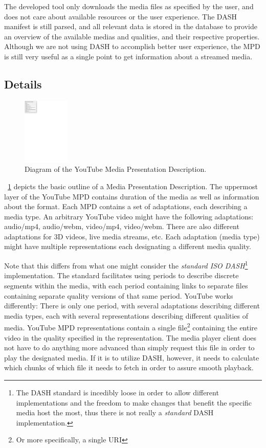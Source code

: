 The developed tool only downloads the media files as specified by the
user, and does not care about available resources or the user experience.
The DASH manifest is still parsed, and all relevant data is stored in the
database to provide an overview of the available medias and qualities,
and their respective properties. Although we are not using DASH to
accomplish better user experience, the MPD is still very useful as a
single point to get information about a streamed media.

\subsection{Details}

\begin{figure}
	\centering
	\includegraphics[width=0.2\textwidth]{figures/dash-mpd-diagram}
	\caption{Diagram of the YouTube Media Presentation Description.}
    \label{fig:dash-mpd-diagram}
\end{figure}

~\ref{fig:dash-mpd-diagram} depicts the basic outline of a Media Presentation
Description. The uppermost layer of the YouTube MPD contains duration of the
media as well as information about the format. Each MPD contains a set of
adaptations, each describing a media type. An arbitrary YouTube video might have
the following adaptations: audio/mp4, audio/webm, video/mp4, video/webm. There
are also different adaptations for 3D videos, live media streams, etc. Each
adaptation (media type) might have multiple representations each designating a
different media quality.

Note that this differs from what one might consider the \textit{standard ISO
DASH}\footnote{The DASH standard is incedibly loose in order to allow different
implementations and the freedom to make changes that benefit the specific media
host the most, thus there is not really a \textit{standard} DASH implementation.}
implementation. The standard facilitates using periods to
describe discrete segments within the media, with each period containing links
to separate files containing separate quality versions of that same period.
YouTube works differently: There is only one period, with several adaptations
describing different media types, each with several representations describing
different qualities of media. YouTube MPD representations contain a single file\footnote{Or more specifically, a single URI}
containing the entire video in the quality specified in the representation.
The media player client does not have to do anything more advanced than simply
request this file in order to play the designated media. If it is to utilize
DASH, however, it needs to calculate which chunks of which file it needs to
fetch in order to assure smooth playback.

